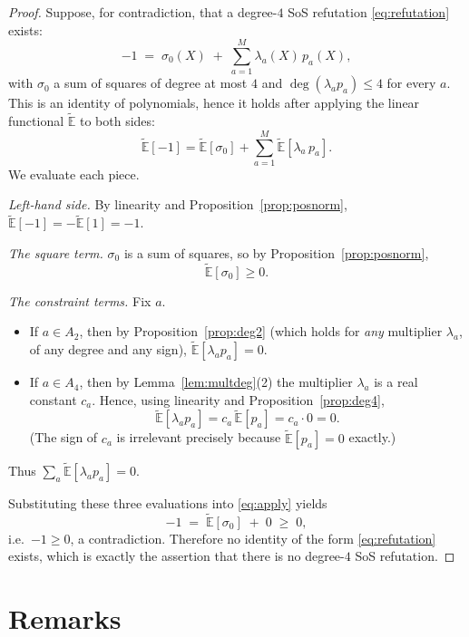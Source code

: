 \documentclass{amsart}
\theoremstyle{definition}
\theoremstyle{remark}
\begin{document}
\begin{proof}
Suppose, for contradiction, that a degree-$4$ SoS refutation \eqref{eq:refutation} exists:
\[
-1\;=\;\sigma_0(X)\;+\;\sum_{a=1}^{M}\lambda_a(X)\,p_a(X),
\]
with $\sigma_0$ a sum of squares of degree at most $4$ and $\deg(\lambda_a p_a)\le4$ for every
$a$. This is an identity of polynomials, hence it holds after applying the linear functional
$\widetilde{\mathbb{E}}$ to both sides:
\begin{equation}\label{eq:apply}
\widetilde{\mathbb{E}}[-1]
=\widetilde{\mathbb{E}}[\sigma_0]
+\sum_{a=1}^{M}\widetilde{\mathbb{E}}[\lambda_a\,p_a].
\end{equation}
We evaluate each piece.

\smallskip
\noindent\emph{Left-hand side.} By linearity and Proposition~\ref{prop:posnorm},
$\widetilde{\mathbb{E}}[-1]=-\widetilde{\mathbb{E}}[1]=-1$.

\smallskip
\noindent\emph{The square term.} $\sigma_0$ is a sum of squares, so by
Proposition~\ref{prop:posnorm},
\[
\widetilde{\mathbb{E}}[\sigma_0]\ge 0 .
\]

\smallskip
\noindent\emph{The constraint terms.} Fix $a$.
\begin{itemize}
\item If $a\in A_2$, then by Proposition~\ref{prop:deg2} (which holds for \emph{any}
multiplier $\lambda_a$, of any degree and any sign), $\widetilde{\mathbb{E}}[\lambda_a p_a]=0$.
\item If $a\in A_4$, then by Lemma~\ref{lem:multdeg}(2) the multiplier $\lambda_a$ is a real
constant $c_a$. Hence, using linearity and Proposition~\ref{prop:deg4},
\[
\widetilde{\mathbb{E}}[\lambda_a p_a]=c_a\,\widetilde{\mathbb{E}}[p_a]=c_a\cdot 0=0 .
\]
(The sign of $c_a$ is irrelevant precisely because $\widetilde{\mathbb{E}}[p_a]=0$ exactly.)
\end{itemize}
Thus $\sum_{a}\widetilde{\mathbb{E}}[\lambda_a p_a]=0$.

\smallskip
Substituting these three evaluations into \eqref{eq:apply} yields
\[
-1\;=\;\widetilde{\mathbb{E}}[\sigma_0]\;+\;0\;\ge\;0 ,
\]
i.e.\ $-1\ge0$, a contradiction. Therefore no identity of the form \eqref{eq:refutation}
exists, which is exactly the assertion that there is no degree-$4$ SoS refutation. \qedhere
\end{proof}

\section{Remarks}\label{sec:remarks}
\end{document}
